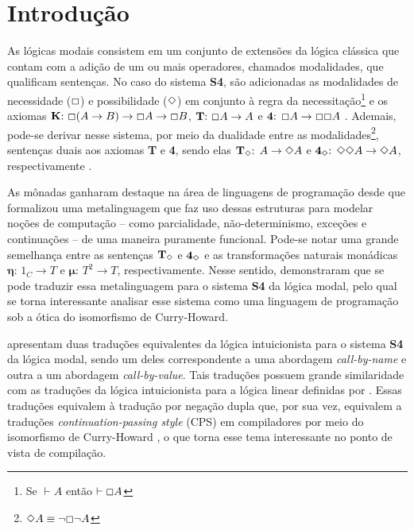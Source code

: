 \chapter{Introdução}

As lógicas modais consistem em um conjunto de extensões da lógica clássica que contam com a adição de um ou mais operadores, chamados modalidades, que qualificam sentenças. No caso do sistema \textbf{S4}, são adicionadas as modalidades de necessidade ($\Box$) e possibilidade ($\Diamond$) em conjunto à regra da necessitação\footnote{Se $\vdash A$ então $\vdash \Box A$} e os axiomas $\text{\textbf{K}: } \Box(A \to B) \to \Box A \to \Box B$, $\text{\textbf{T}: } \Box A \to A$ e $\text{\textbf{4}: } \Box A \to \Box \Box A$ \cite{Troelstra}. Ademais, pode-se derivar nesse sistema, por meio da dualidade entre as modalidades\footnote{$\Diamond A \equiv \neg \Box \neg A $}, sentenças duais aos axiomas \textbf{T} e \textbf{4}, sendo elas $\boldsymbol{\text{\textbf{T}}_\Diamond \text{: }} A \to \Diamond A$ e $\boldsymbol{\text{\textbf{4}}_\Diamond \text{: }} \Diamond \Diamond A \to \Diamond A$, respectivamente \cite{Zach}.

As mônadas ganharam destaque na área de linguagens de programação desde que \cite{Moggi} formalizou uma metalinguagem que faz uso dessas estruturas para modelar noções de computação -- como parcialidade, não-determinismo, exceções e continuações -- de uma maneira puramente funcional. Pode-se notar uma grande semelhança entre as sentenças $\boldsymbol{\text{\textbf{T}}_\Diamond}$ e $\boldsymbol{\text{\textbf{4}}_\Diamond}$ e as transformações naturais monádicas $\boldsymbol{\eta \text{: }} 1_C \to T$ e $\boldsymbol{\mu \text{: }} T^2 \to T$, respectivamente. Nesse sentido, \cite{Pfenning} demonstraram que se pode traduzir essa metalinguagem para o sistema \textbf{S4} da lógica modal, pelo qual se torna interessante analisar esse sistema como uma linguagem de programação sob a ótica do isomorfismo de Curry-Howard.

\cite{Troelstra} apresentam duas traduções equivalentes da lógica intuicionista para o sistema \textbf{S4} da lógica modal, sendo um deles correspondente a uma abordagem \textit{call-by-name} e outra a um abordagem \textit{call-by-value}. Tais traduções possuem grande similaridade com as traduções da lógica intuicionista para a lógica linear definidas por \cite{Girard}. Essas traduções equivalem à tradução por negação dupla que, por sua vez, equivalem a traduções \textit{continuation-passing style} (CPS) em compiladores por meio do isomorfismo de Curry-Howard \cite{Reynolds}, o que torna esse tema interessante no ponto de vista de compilação.

